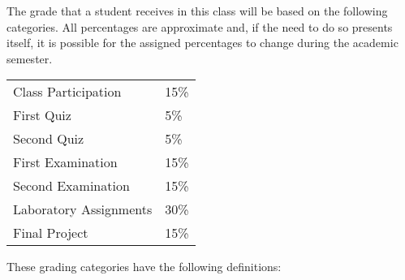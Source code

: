 \documentclass[11pt]{article} %
\begin{document}
The grade that a student receives in this class will be based on the following categories. All percentages are
approximate and, if the need to do so presents itself, it is possible for the assigned percentages to change during the
academic semester. 
\color{red}
\begin{center}
  \begin{tabular}{l|l}
\hline
    Class Participation & 15\% \\  %
    First Quiz & 5\% \\
    Second Quiz & 5\% \\
    First Examination & 15\% \\
    Second Examination & 15\% \\
    Laboratory  Assignments & 30\% \\
    Final Project & 15\% \\
\hline
  \end{tabular}
\end{center}
\color{black}
\noindent
These grading categories have the following definitions:
\vspace*{-.05in}



\color{black}
\end{document}
